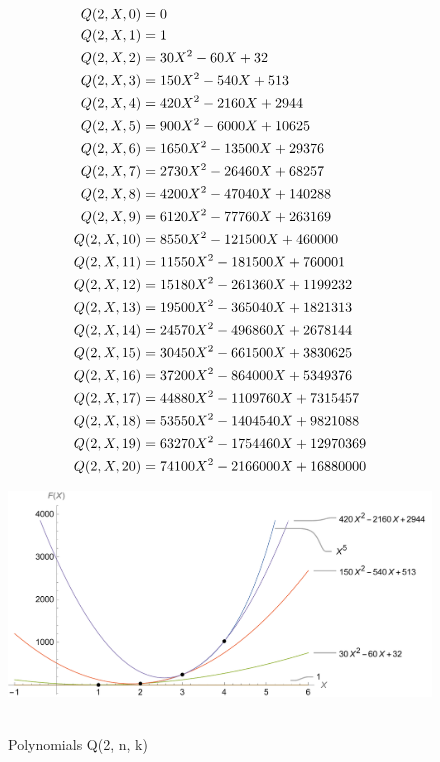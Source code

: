 ﻿\begin{align*}
    {Q}(2,X,0) &= 0 \\
    {Q}(2,X,1) &= 1 \\
    {Q}(2,X,2) &= 30X^2 - 60X + 32 \\
    {Q}(2,X,3) &= 150X^2 - 540X + 513 \\
    {Q}(2,X,4) &= 420X^2 - 2160X + 2944 \\
    {Q}(2,X,5) &= 900X^2 - 6000X + 10625 \\
    {Q}(2,X,6) &= 1650X^2 - 13500X + 29376 \\
    {Q}(2,X,7) &= 2730X^2 - 26460X + 68257 \\
    {Q}(2,X,8) &= 4200X^2 - 47040X + 140288 \\
    {Q}(2,X,9) &= 6120X^2 - 77760X + 263169 \\
    {Q}(2,X,10) &= 8550X^2 - 121500X + 460000 \\
    {Q}(2,X,11) &= 11550X^2 - 181500X + 760001 \\
    {Q}(2,X,12) &= 15180X^2 - 261360X + 1199232 \\
    {Q}(2,X,13) &= 19500X^2 - 365040X + 1821313 \\
    {Q}(2,X,14) &= 24570X^2 - 496860X + 2678144 \\
    {Q}(2,X,15) &= 30450X^2 - 661500X + 3830625 \\
    {Q}(2,X,16) &= 37200X^2 - 864000X + 5349376 \\
    {Q}(2,X,17) &= 44880X^2 - 1109760X + 7315457 \\
    {Q}(2,X,18) &= 53550X^2 - 1404540X + 9821088 \\
    {Q}(2,X,19) &= 63270X^2 - 1754460X + 12970369 \\
    {Q}(2,X,20) &= 74100X^2 - 2166000X + 16880000
\end{align*}
\begin{figure}[H]
    \centering
    \includegraphics[width=1\textwidth]{sections/images/04_plots_fifth_with_q2}
    ~\caption{Polynomials Q(2, n, k)}\label{fig:figure4}
\end{figure}
